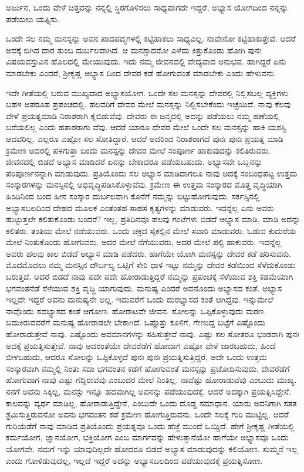 {\small ಅರ್ಜುನ, ಒಂದು ವೇಳೆ ಚಿತ್ತವನ್ನು ನನ್ನಲ್ಲಿ ಸ್ಥಿರಗೊಳಿಸಲು ಸಾಧ್ಯವಾಗದೇ ಇದ್ದರೆ, ಅಭ್ಯಾಸ ಯೋಗದಿಂದ ನನ್ನನ್ನು ಪಡೆಯಲು ಯತ್ನಿಸು.}

ಒಂದೇ ಸಲ ನಮ್ಮ ಮನಸ್ಸನ್ನು ಅವನ ಪಾದಪದ್ಮಗಳಲ್ಲಿ ಕಟ್ಟಿಹಾಕಲು ಸಾಧ್ಯವಿಲ್ಲ. ನಾವೇನೋ ಕಟ್ಟಿಹಾಕುತ್ತೇವೆ. ಆದರೆ ಅದಕ್ಕೆ ಬಿಗಿದ ದಾರ ತುಂಬ ದುರ್ಬಲವಾಗಿದೆ. ಆ ಮನಸ್ಸಾದರೋ ಎಳೆದು ಕಿತ್ತುಕೊಂಡು ಹೋಗಿ ಪುನಃ ವಿಷಯವಸ್ತುವಿನ ಹೊಲದಲ್ಲಿ ಮೇಯುವುದು. ಇದು ನಮ್ಮ ಜೀವನದಲ್ಲಿ ವೇದ್ಯವಾದ ಅನುಭವ. ಹಾಗಿದ್ದರೆ ಏನು ಮಾಡಬೇಕು ಎಂದರೆ, ಶ್ರೀಕೃಷ್ಣ ಅಭ್ಯಾಸ ದಿಂದ ದೇವರ ಕಡೆ ಹೋಗುವಂತೆ ಮಾಡಬೇಕು ಎಂದು ಹೇಳುವನು.

ಇದೇ ಗೀತೆಯಲ್ಲಿ ಬರುವ ಮುಖ್ಯವಾದ ಅಭ್ಯಾಸಯೋಗ. ಒಂದೇ ಸಲ ಮನಸ್ಸನ್ನು ದೇವರಲ್ಲಿ ನಿಲ್ಲಿಸಬಲ್ಲ ವ್ಯಕ್ತಿಗಳು ಬಹಳ ಅಪರೂಪ ಪ್ರಪಂಚದಲ್ಲಿ. ಹಲವರಿಗೆ ದೇವರ ಮೇಲೆ ಮನಸ್ಸನ್ನು ನಿಲ್ಲಿಸಬೇಕೆಂದು ಇಚ್ಛೆಯಿದೆ. ನಾವು ಕೆಲವು ವೇಳೆ ಪ್ರಯತ್ನಮಾಡಿ ನಿರಾಶರಾಗಿ ಕೈಬಿಡುವೆವು. ದೇವರು ಈ ಜನ್ಮದಲ್ಲಿ ಅದನ್ನು ಪಡೆಯಲು ನಮ್ಮ ಹಣೆಯಲ್ಲಿ ಬರೆಯಲಿಲ್ಲ ಎಂದು ಹತಾಶರಾಗು ವೆವು. ಆದರೆ ಯಾರೂ ದೇವರ ಮೇಲೆ ಒಂದೇ ಸಲ ಮನಸ್ಸನ್ನು ಹಾಕಿ ಯಶಸ್ವಿ ಆದವರಿಲ್ಲ. ಎಲ್ಲರೂ ಎಷ್ಟೋ ಸಲ ಸೋತಿದ್ದಾರೆ. ಆದರೆ ಅದರಿಂದ ನಿರಾಶರಾಗದೆ ಪುನಃ ಪುನಃ ಪ್ರಯತ್ನ ಮಾಡಿ ಕ್ರಮೇಣ ಅದರಲ್ಲಿ ಪಳಗುತ್ತಾ ಬಂದು ಮನಸ್ಸನ್ನು ದೇವರ ಮೇಲೆ ಸಂಪೂರ್ಣ ಹಾಕುವುದನ್ನು ಕಲಿತಿರುವರು. ಜೀವನದಲ್ಲಿ ಬಿಡದೆ ಅಭ್ಯಾಸ ಮಾಡಿದರೆ ಏನನ್ನು ಬೇಕಾದರೂ ಪಡೆಯಬಹುದು. ಅಭ್ಯಾಸವೇ ಒಬ್ಬನನ್ನು ಪರಿಪೂರ್ಣನನ್ನಾಗಿ ಮಾಡುವುದು. ಪ್ರತಿಯೊಂದು ಸಲ ಅಭ್ಯಾಸ ಮಾಡಿದಾಗಲೂ ನಾವು ಅದಕ್ಕೆ ಸಂಬಂಧಪಟ್ಟ ಉತ್ತಮ ಸಂಸ್ಕಾರಗಳನ್ನು ಮನಸ್ಸಿನಲ್ಲಿ ಅಭಿವೃದ್ಧಿಪಡಿಸಿಕೊಳ್ಳುವೆವು. ಕ್ರಮೇಣ ಈ ಉತ್ತಮ ಸಂಸ್ಕಾರದ ಮೊತ್ತ ವೃದ್ಧಿಯಾಗಿ ಹಿಂದಿನಿಂದ ಬಂದ ಹೀನ ಸಂಸ್ಕಾರ ದುರ್ಬಲವಾಗಿ ಕೊನೆಗೆ ನಮ್ಮನ್ನು ಬಿಟ್ಟುಹೋಗುವುದು. ಸರ್ಕಸ್ಸಿನಲ್ಲಿ ಅಭ್ಯಾಸಬಲದಿಂದ ದೇಹದ ಮೂಲಕ ಎಂತೆಂತಹ ಸಾಹಸ ಕೃತ್ಯಗಳನ್ನು ಮಾಡುವರು. ಇದನ್ನೆಲ್ಲ ಏನು ಅವರು ಹುಟ್ಟುತ್ತಲೇ ಕಲಿತುಕೊಂಡು ಬಂದರೆ? ಇಲ್ಲ, ಪ್ರತಿದಿನವೂ ಹಲವು ಗಂಟೆಗಳು ಬಿಡದೆ ಅಭ್ಯಾಸ ಮಾಡಿ, ಮಾಡಿ ಅದನ್ನು ಕಲಿತರು. ತಂತಿಯ ಮೇಲೆ ನಡೆಯುವರು. ಒಂದು ಚಕ್ರದ ಸೈಕಲ್ಲಿನ ಮೇಲೆ ಸವಾರಿ ಮಾಡುವರು. ಓಡುವ ಕುದುರೆಯ ಮೇಲೆ ನಿಂತುಕೊಂಡು ಹೋಗುವರು. ಅದರ ಮೇಲೆ ನೆಗೆಯುವರು, ಅದರ ಮೇಲೆ ಪಲ್ಟಿ ಹಾಕುವರು. ಇದನ್ನೆಲ್ಲ ಅವರು ಹಲವು ಕಾಲ ಬಿಡದೆ ಅಭ್ಯಾಸ ಮಾಡಿ ಪಡೆದರು. ಹಾಗೆಯೇ ಯೋಗಿ ಮನಸ್ಸನ್ನು ದೇವರ ಕಡೆ ಹರಿಸುವನು. ಮೊದಮೊದಲು ನಮ್ಮ ಮನಸ್ಸಿನ ದೌರ್ಬಲ್ಯ ಒಟ್ಟಿಗೆ ಸೇರಿ ಧಾಳಿ ಇಟ್ಟು ನಮ್ಮನ್ನು ದೇವರ ಕಡೆಯಿಂದ ಸೆಳೆದುಕೊಂಡು ಬರುತ್ತದೆ. ಆದರೆ ಬಿಡದೆ ನಾವು ಪದೇ ಪದೇ ಹೋರಾಡುತ್ತಿದ್ದರೆ ನಮ್ಮನ್ನು ಪ್ರಪಂಚಕ್ಕೆ ಸೆಳೆಯುವ ಶಕ್ತಿ ಕಡಮೆಯಾಗಿ ಭಗವಂತನೆಡೆ ಸೆಳೆಯುವ ಶಕ್ತಿ ವೃದ್ಧಿ ಯಾಗುವುದು. ಮನುಷ್ಯ ಎಂದರೆ ಅವನೊಂದು ಅಭ್ಯಾಸದ ಕಂತೆ. ಅಭ್ಯಾಸ ಇಲ್ಲದೇ ಇದ್ದರೆ ಅವನು ಮನುಷ್ಯನೇ ಅಲ್ಲ. ಇದುವರೆಗೆ ಒಂದು ದುರಭ್ಯಾಸದ ಕಂತೆ ಆಗಿದ್ದೆವು. ಇನ್ನುಮೇಲೆ ನಾವೊಂದು ಸದಭ್ಯಾಸದ ಕಂತೆ ಆಗೋಣ. ಹೋರಾಟವೇ ಜೀವನ. ಸೋಲನ್ನು ಒಪ್ಪಿಕೊಳ್ಳುವುದು ಮರಣ. ಬದುಕಿರುವವರೆಗೆ ಮನುಷ್ಯ ಹೋರಾಡಲೇ ಬೇಕಾಗಿದೆ. ಒಪ್ಪೊತ್ತು ಕೂಳಿಗೆ, ಗೇಣುದ್ದ ಬಟ್ಟೆಗೆ ಎಷ್ಟೊಂದು ಹೋರಾಡುತ್ತೇವೆ ನಾವು. ಎಷ್ಟೊಂದು ಅವಮಾನಗಳನ್ನು ಸಹಿಸುತ್ತೇವೆ ನಾವು. ಎಷ್ಟು ಸಲ ಸೋತರೂ ಭಂಡರಾಗಿ ಪುನಃ ಅದಕ್ಕೆ ಪ್ರಯತ್ನಿಸುತ್ತೇವೆ. ನಾವು ಅದರಂತೆಯೇ ದೇವರೆಡೆಗೆ ಹೋದಾಗ ಎಷ್ಟೋ ವೇಳೆ ಜಾರಬಹುದು, ಹಿಂದೆ ಬೀಳಬಹುದು, ಆದರೂ ಸೋಲನ್ನು ಒಪ್ಪಿಕೊಳ್ಳದೆ ಪುನಃ ಪುನಃ ಪ್ರಯತ್ನಿಸುತ್ತಿದ್ದರೆ, ಅದೇ ಒಂದು ಉತ್ತಮ ಸಂಸ್ಕಾರವಾಗಿ ನಮ್ಮಲ್ಲಿ ನಿಂತು ಸದಾ ಭಗವಂತನ ಕಡೆಗೆ ಹೋಗುವಂತೆ ಮನಸ್ಸನ್ನು ಪ್ರಚೋದಿಸುವುದು. ದೇವರೆಡೆಗೆ ಹೋಗುವಾಗ ನಾವು ಎಷ್ಟು ಗೆದ್ದಿರುವೆವು ಎಂಬುದರ ಮೇಲೆ ನಿಂತಿಲ್ಲ. ನಾವೆಷ್ಟು ಹೋರಾಡುವೆವು ಎಂಬುದು ಮುಖ್ಯ. ನನಗೆ ಅವನು ಸಿಕ್ಕಿಲ್ಲ, ಮನಸ್ಸು ಇನ್ನೂ ಹದವಾಗಿಲ್ಲ ಅವನನ್ನು ಪಡೆಯುವುದಕ್ಕೆ. ಆದರೆ ಅದಕ್ಕಾಗಿ ಪ್ರಯತ್ನಿಸಿದ್ದೇನೆ. ಕಾಲವನ್ನು ವ್ಯರ್ಥ ಮಾಡಿಲ್ಲ, ಹೋರಾಡುತ್ತಿದ್ದೇನೆ, ಎಂಬುದೇ ಒಂದು ದೊಡ್ಡ ಸಮಾಧಾನ. ಯಾರು ಅವನಿಗಾಗಿ ಸತತ ಶ್ರಮಿಸುತ್ತಿರುವನೋ ಅವನು ಭಗವಂತನ ಕಡೆ ಕ್ರಮೇಣ ಹೋಗುತ್ತಿರುವನು. ಒಂದೇ ಸಲಕ್ಕೆ ಗುರಿ ಮುಟ್ಟಿಲ್ಲ. ಆದರೆ ಗುರಿಯೆಡೆಗೆ ನಾವು ಮಾಡಿದ ಪ್ರತಿಯೊಂದು ಪ್ರಯತ್ನವೂ ಒಂದು ಹೆಜ್ಜೆ ಮುಂದೆ ಒಯ್ದಿದೆ. ಹೇಗೆ ಶ್ರೀಕೃಷ್ಣ ಗೀತೆಯಲ್ಲಿ ಕರ್ಮಯೋಗ, ಜ್ಞಾನಯೋಗ, ಭಕ್ತಿಯೋಗ ಎಂಬ ಮಾರ್ಗವನ್ನು ಹೇಳುತ್ತಾನೆಯೋ ಹಾಗೆಯೇ ಅಭ್ಯಾಸವೂ ಒಂದು ಯೋಗವೇ. ನಮಗೆ ಇನ್ನು ಯಾವುದಿಲ್ಲದೇ ಹೋದರೂ ಬಿಡದೆ ಅಭ್ಯಾಸ ಮಾಡುವುದನ್ನು ಕಲಿಯೋಣ. ಸುಮ್ಮನೆ ಇಲ್ಲ ಎಂದು ಗೋಳಿಡುವುದಲ್ಲ, ಇಲ್ಲದೆ ಇದ್ದರೆ ಅದನ್ನು ಅಭ್ಯಾಸಬಲದಿಂದ ಪಡೆಯುವುದಕ್ಕೆ ಪ್ರಯತ್ನಿಸೋಣ.

